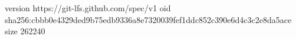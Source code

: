version https://git-lfs.github.com/spec/v1
oid sha256:cbbb0e4329ded9b75edb9336a8e7320039fef1ddc852c390e6d4c3c2e8da5ace
size 262240
